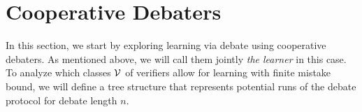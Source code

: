 \documentclass[11pt,letterpaper]{article}
\theoremstyle{definition}
\theoremstyle{plain}
\begin{document}



















\section{Cooperative Debaters}
\label{sec:cooperative-case}
In this section, we start by exploring learning via debate using cooperative debaters. As mentioned above, we will call them jointly \emph{the learner} in this case. To analyze which classes ${\mathcal V}$ of verifiers allow for learning with finite mistake bound, we will define a tree structure that represents potential runs of the debate protocol for debate length $n$.
\end{document}
